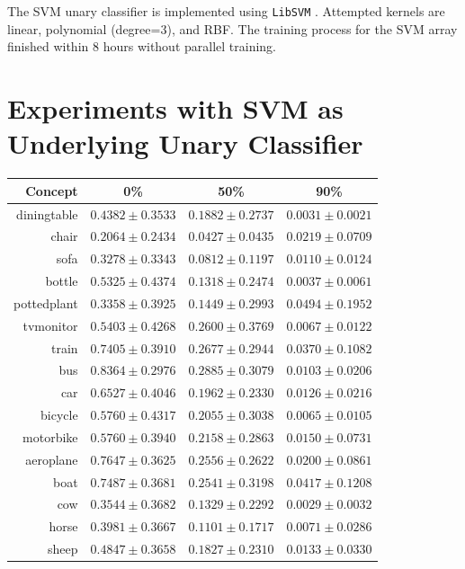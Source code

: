 \documentclass[11pt,a4paper]{article}
\begin{document}
The SVM unary classifier is implemented using \texttt{LibSVM} \cite{libsvm}. Attempted kernels are linear, polynomial (degree=3), and RBF. The training process for the SVM array finished within 8 hours without parallel training.

\section{Experiments with SVM as Underlying Unary Classifier}
\label{sec:svm}

\begin{table}[htbp]
\centering
\begin{tabular}{r|c|c|c}
Concept & 0\% & 50\% & 90\%\\\hline
diningtable   & $0.4382\pm0.3533$ & $0.1882\pm0.2737$ & $0.0031\pm0.0021$\\
chair         & $0.2064\pm0.2434$ & $0.0427\pm0.0435$ & $0.0219\pm0.0709$\\
sofa          & $0.3278\pm0.3343$ & $0.0812\pm0.1197$ & $0.0110\pm0.0124$\\
bottle        & $0.5325\pm0.4374$ & $0.1318\pm0.2474$ & $0.0037\pm0.0061$\\
pottedplant   & $0.3358\pm0.3925$ & $0.1449\pm0.2993$ & $0.0494\pm0.1952$\\
tvmonitor     & $0.5403\pm0.4268$ & $0.2600\pm0.3769$ & $0.0067\pm0.0122$\\
train         & $0.7405\pm0.3910$ & $0.2677\pm0.2944$ & $0.0370\pm0.1082$\\
bus           & $0.8364\pm0.2976$ & $0.2885\pm0.3079$ & $0.0103\pm0.0206$\\
car           & $0.6527\pm0.4046$ & $0.1962\pm0.2330$ & $0.0126\pm0.0216$\\
bicycle       & $0.5760\pm0.4317$ & $0.2055\pm0.3038$ & $0.0065\pm0.0105$\\
motorbike     & $0.5760\pm0.3940$ & $0.2158\pm0.2863$ & $0.0150\pm0.0731$\\
aeroplane     & $0.7647\pm0.3625$ & $0.2556\pm0.2622$ & $0.0200\pm0.0861$\\
boat          & $0.7487\pm0.3681$ & $0.2541\pm0.3198$ & $0.0417\pm0.1208$\\
cow           & $0.3544\pm0.3682$ & $0.1329\pm0.2292$ & $0.0029\pm0.0032$\\
horse         & $0.3981\pm0.3667$ & $0.1101\pm0.1717$ & $0.0071\pm0.0286$\\
sheep         & $0.4847\pm0.3658$ & $0.1827\pm0.2310$ & $0.0133\pm0.0330$\\

\end{tabular}
\end{table}
\end{document}
